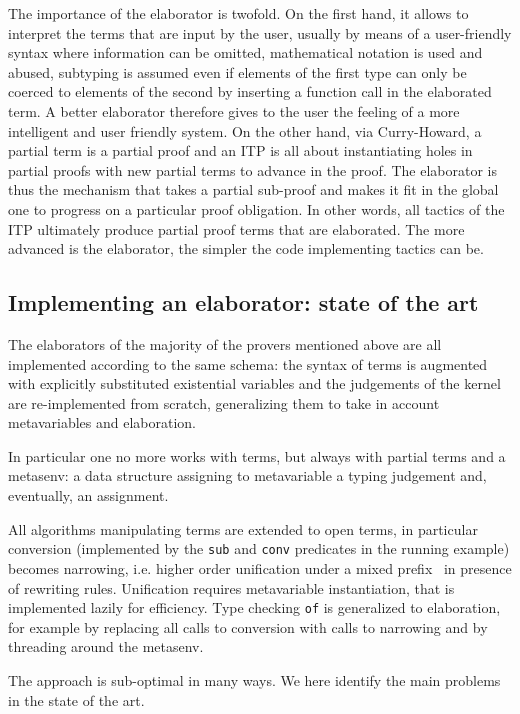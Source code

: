 \documentclass{easychair}
\begin{document}
The importance of the elaborator is twofold. On the first hand, it
allows to interpret the terms that are input by the user, usually by
means of a user-friendly syntax where information can be omitted,
mathematical notation is used and abused, subtyping is assumed even if
elements of the first type can only be coerced to elements of the
second by inserting a function call in the elaborated term. A better
elaborator therefore gives to the user the feeling of a more
intelligent and user friendly system. On the other hand, via
Curry-Howard, a partial term is a partial proof and an ITP is all
about instantiating holes in partial proofs with new partial terms to
advance in the proof. The elaborator is thus the mechanism that takes
a partial sub-proof and makes it fit in the global one to progress on
a particular proof obligation. In other words, all tactics of the ITP
ultimately produce partial proof terms that are elaborated. The more
advanced is the elaborator, the simpler the code implementing tactics
can be.

\subsection{Implementing an elaborator: state of the art}  %

The elaborators of the majority of the provers mentioned above are all
implemented according to the same schema: the syntax of terms is augmented with
explicitly substituted existential variables
and the judgements of the kernel are re-implemented from scratch, generalizing
them to take in account metavariables and elaboration.

In particular one no more works with terms, but always with partial terms and
a metasenv: a data structure assigning to metavariable a typing judgement
and, eventually, an assignment.

All algorithms manipulating terms are extended to open
terms, in particular conversion (implemented by the 
\verb+sub+  and \verb+conv+ predicates in the running example)
becomes narrowing, i.e. higher order unification under a
mixed prefix~\cite{???} in presence of rewriting rules.
Unification requires metavariable instantiation, that is
implemented lazily for efficiency.  Type checking \verb+of+ is generalized to
elaboration, for example by replacing all calls to conversion with calls to
narrowing and by threading around the metasenv.

The approach is sub-optimal in many ways.  We here identify the main problems
in the state of the art.
\end{document}
